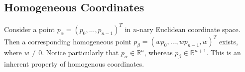 \documentclass[11pt]{article}
\begin{document}
\newpage
\subsection{Homogeneous Coordinates}
Consider a point $p_\alpha = (p_0, \dots, p_{n-1})^T$ in $n$-nary Euclidean
coordinate space. Then a corresponding homogeneous point $p_\beta = (wp_0,
\dots, wp_{n-1}, w)^T$ exists, where $w \neq 0$. Notice particularly that
$p_\alpha \in \mathbb{R}^n$, whereas $p_\beta \in \mathbb{R}^{n+1}$. This is
an inherent property of homogenous coordinates.

%   
%        
%    
%    
%    
\end{document}
